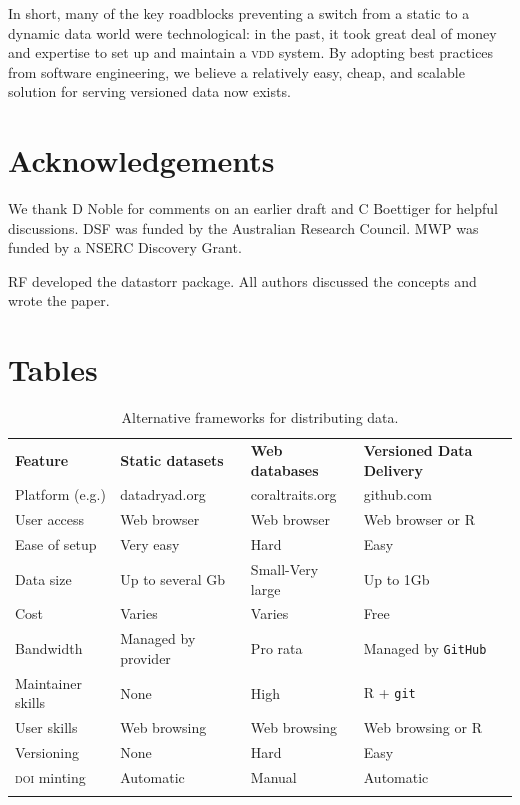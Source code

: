 \documentclass[english]{article}
\begin{document}
In short, many of the key roadblocks preventing a switch from a static to a dynamic data world were technological: in the past, it took great deal of money and expertise to set up and maintain a \textsc{vdd} system. By adopting best practices from software engineering, we believe a relatively easy, cheap, and scalable solution for serving versioned data now exists.

\section*{Acknowledgements}
We thank D Noble for comments on an earlier draft and C Boettiger for helpful discussions. DSF was funded by the Australian Research Council. MWP was funded by a NSERC Discovery Grant.

RF developed the datastorr package. All authors discussed the concepts and wrote the paper. 

\newpage

\section*{Tables}

\begin{table}[h!]
\centering
\caption{Alternative frameworks for distributing data.}
{\footnotesize
\vspace{1cm}
  \begin{tabular}{p{2.5cm}p{3cm}p{3cm}p{4cm}}
  \hline
  \textbf{Feature} & \textbf{Static datasets}& \textbf{Web databases} & \textbf{Versioned Data Delivery}\\
   Platform (e.g.) 	& datadryad.org 			& coraltraits.org	  &  github.com\\
   User access      & Web browser 				& Web browser 			& Web browser or R \\
   Ease of setup    & Very easy 					& Hard 							& Easy\\
   Data size        & Up to several Gb 		& Small-Very large 	& Up to 1Gb\\
   Cost             & Varies 							& Varies  					& Free \\
   Bandwidth        & Managed by provider & Pro rata 					& Managed by \texttt{GitHub}\\
   Maintainer skills & None 							& High							& R + \texttt{git} \\
   User skills      & Web browsing 	& Web browsing  					& Web browsing or R \\
   Versioning       & None 					& Hard 										& Easy \\
   \textsc{doi} minting  &Automatic & Manual 									& Automatic \\
  \hline 
  \\
 
  \end{tabular}
  } 
\label{tab:publishing_models}
\end{table}
\end{document}
